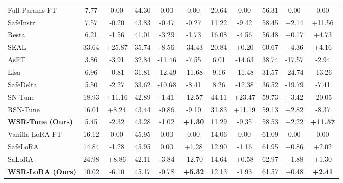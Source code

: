 \documentclass{article}
\begin{document}
\begin{table}[t]
{\begin{tabular}{lccccc|ccccc}
Full Params FT
& 7.77 & 0.00 & 44.30 & 0.00 & 0.00
& 20.64 & 0.00 & 56.31 & 0.00 & 0.00 \\

SafeInstr
& 7.57 & -0.20 & 43.83 & -0.47 & -0.27
& 11.22 & -9.42 & 58.45 & +2.14 & +11.56 \\

Resta
& 6.21 & -1.56 & 41.01 & -3.29 & -1.73
& 16.08 & -4.56 & 56.48 & +0.17 & +4.73 \\

SEAL
& 33.64 & +25.87 & 35.74 & -8.56 & -34.43
& 20.84 & +0.20 & 60.67 & +4.36 & +4.16 \\

AsFT
& 3.86 & -3.91 & 32.84 & -11.46 & -7.55
& 6.01 & -14.63 & 38.74 & -17.57 & -2.94 \\

Lisa
& 6.96 & -0.81 & 31.81 & -12.49 & -11.68
& 9.16 & -11.48 & 31.57 & -24.74 & -13.26 \\

SafeDelta
& 5.50 & -2.27 & 33.62 & -10.68 & -8.41
& 8.26 & -12.38 & 36.52 & -19.79 & -7.41 \\

SN-Tune
& 18.93 & +11.16 & 42.89 & -1.41 & -12.57
& 44.11 & +23.47 & 59.73 & +3.42 & -20.05 \\

RSN-Tune
& 16.01 & +8.24 & 43.44 & -0.86 & -9.10
& 31.83 & +11.19 & 59.13 & +2.82 & -8.37 \\

\textbf{WSR-Tune (Ours)}
& 5.45 & -2.32 & 43.28 & -1.02 & \cellcolor{green!20}\textbf{+1.30}
& 11.29 & -9.35 & 58.53 & +2.22 & \cellcolor{green!20}\textbf{+11.57} \\

\midrule

Vanilla LoRA FT
& 16.12 & 0.00 & 45.95 & 0.00 & 0.00
& 14.06 & 0.00 & 61.09 & 0.00 & 0.00 \\

SafeLoRA
& 14.84 & -1.28 & 45.95 & 0.00 & +1.28
& 12.90 & -1.16 & 61.95 & +0.86 & +2.02 \\

SaLoRA
& 24.98 & +8.86 & 42.11 & -3.84 & -12.70
& 14.64 & +0.58 & 62.97 & +1.88 & +1.30 \\

\textbf{WSR-LoRA (Ours)}
& 10.02 & -6.10 & 45.17 & -0.78 & \cellcolor{green!20}\textbf{+5.32}
& 12.13 & -1.93 & 61.57 & +0.48 & \cellcolor{green!20}\textbf{+2.41} \\


\end{tabular}}
\end{table}
\end{document}
